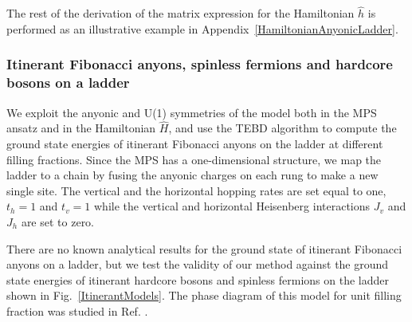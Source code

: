 \documentclass[aps,reprint,superscriptaddress,amsmath,amssymb,amsfonts,prb]{revtex4-1}
\begin{document}
The rest of the derivation of the matrix expression for the Hamiltonian $\hat{h}$ is performed as an illustrative example in Appendix~\ref{HamiltonianAnyonicLadder}. 


\subsubsection{Itinerant Fibonacci anyons, spinless fermions and hardcore bosons on a ladder}
We exploit the anyonic and U(1) symmetries of the model both in the MPS ansatz and in the Hamiltonian $\hat{H}$, and use the TEBD algorithm to compute the ground state energies of itinerant Fibonacci anyons on the ladder at different filling fractions. Since the MPS has a one-dimensional structure, we map the ladder to a chain by fusing the anyonic charges on each rung to make a new single site. The vertical and the horizontal hopping rates are set equal to one, $t_h = 1$ and $t_v=1$ while the vertical and horizontal Heisenberg interactions $J_v$ and $J_h$ are set to zero. %

There are no known analytical results for the ground state of itinerant Fibonacci anyons on a ladder, but we test the validity of our method against the ground state energies of itinerant hardcore bosons and spinless fermions on the ladder shown in Fig.~\ref{ItinerantModels}. The phase diagram of this model for unit filling fraction was studied in Ref. .
\end{document}
